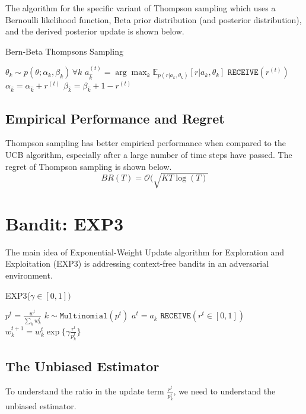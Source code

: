 \documentclass[11pt]{article}
\begin{document}
The algorithm for the specific variant of Thompson sampling which uses a Bernoulli likelihood function, Beta prior distribution (and posterior distribution), and the derived posterior update is shown below.
\begin{algorithm}[H]
\caption{Bern-Beta Thompsons Sampling}
\begin{algorithmic}[1]
    \STATE $\theta_k \sim p(\theta; \alpha_k, \beta_k)\, \forall k$
    \STATE $a_{\hat{k}}^{(t)} = \arg\max_k \mathbb{E}_{p(r|a_k,\theta_k)}[r|a_k,\theta_k]$
    \STATE $\texttt{RECEIVE}(r^{(t)})$
    \STATE $\alpha_{\hat{k}} = \alpha_{\hat{k}} + r^{(t)}$
    \STATE $\beta_{\hat{k}} = \beta_{\hat{k}} + 1 - r^{(t)}$
\ENDFOR
\end{algorithmic}
\end{algorithm}

\subsection{Empirical Performance and Regret}
Thompson sampling has better empirical performance  when compared to the UCB algorithm, especially after a large number of time steps have passed. The regret of Thompson sampling is shown below.
\[ BR(T) = \mathcal{O}(\sqrt{KT\log (T)} \]

\section{Bandit: EXP3}
The main idea of Exponential-Weight Update algorithm for Exploration and Exploitation (EXP3) is addressing context-free bandits in an adversarial environment.

\begin{algorithm}[H]
\caption{EXP3($\gamma \in [0,1])$}
\begin{algorithmic}
    \STATE $p^t = \frac{w^t}{\sum_k w_k^t}$
    \STATE $k \sim \texttt{Multinomial}(p^t)$
    \STATE $a^t = a_k$
    \STATE $\texttt{RECEIVE}(r^t \in [0,1])$
    \STATE $w_k^{t+1} = w_k^t \exp\{\gamma \frac{r^t}{p_k^t}\}$
\ENDFOR
\end{algorithmic}
\end{algorithm}

\subsection{The Unbiased Estimator}
To understand the ratio in the update term $\frac{r^t}{p_k^t}$, we need to understand the unbiased estimator.
\end{document}
